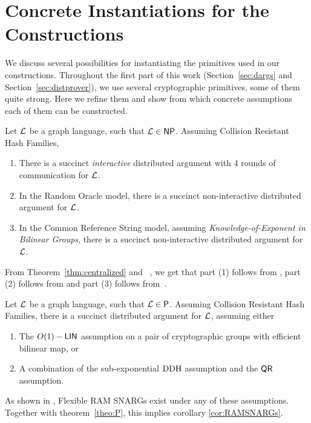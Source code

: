 \section{Concrete Instantiations for the Constructions }\label{app:concrete}
We discuss several possibilities for instantiating the primitives used in our constructions. Throughout the first part of this work (Section~\ref{sec:dargs} and Section~\ref{sec:distprover}), we use several cryptographic primitives, some of them quite strong. Here we refine them and show from which concrete assumptions each of them can be constructed. 

\begin{theorem}\label{thm:concDargs}
    Let $\mathcal{L}$ be a graph language, such that $\mathcal{L}\in {\mathsf{NP}}$. Assuming Collision Resistant Hash Families,
    \begin{enumerate}
        \item There is a succinct \emph{interactive} distributed argument with 4 rounds of communication for $\mathcal{L}$. 
        \item In the Random Oracle model, there is a succinct non-interactive distributed argument for $\mathcal{L}$.
        \item In the Common Reference String model, assuming \emph{Knowledge-of-Exponent in Bilinear Groups}, there is a succinct non-interactive distributed argument for $\mathcal{L}$. 
    \end{enumerate}
\end{theorem}
From Theorem~\ref{thm:centralized} and ~\cite{merkle1989certified}, we get that part (1) follows from \cite{kilian1992note}, part (2) follows from \cite{micali2000computationally} and part (3) follows from~\cite{bitansky2013SNARKsLIPs}.

\begin{theorem}\label{thm:concDargs}
    Let $\mathcal{L}$ be a graph language, such that $\mathcal{L}\in {\mathsf{P}}$. Assuming Collision Resistant Hash Families, there is a succinct distributed argument for $\mathcal{L}$, assuming either
    \begin{enumerate}
        \item The $O(1)-\mathsf{LIN}$ assumption on a pair of cryptographic groups with efficient bilinear map, or
        \item A combination of the sub-exponential $\mathrm{DDH}$ assumption and the $\mathsf{QR}$ assumption.
    \end{enumerate}
\end{theorem}
As shown in  \cite{cryptoeprint:2022/1320}, Flexible RAM SNARGs exist under any of these assumptions. Together with theorem~\ref{theo:P}, this implies corollary \ref{cor:RAMSNARGs}.

